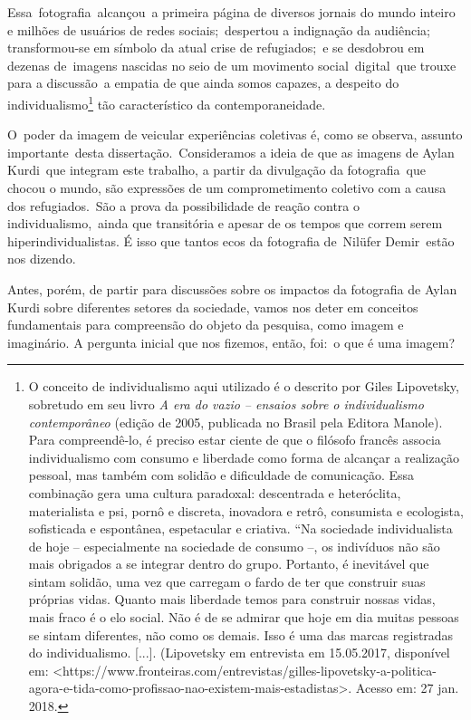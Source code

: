 \documentclass[
  letterpaper,
  a4paper,
  12pt]{scrbook}
\begin{document}
Essa~fotografia~alcançou~a primeira página de diversos jornais do mundo
inteiro e milhões de usuários de redes sociais;~despertou a indignação
da audiência; transformou-se em símbolo da atual crise de refugiados;~e
se desdobrou em dezenas de~imagens nascidas no seio de um movimento
social~digital~que trouxe para a discussão~a empatia de que ainda somos
capazes, a despeito do individualismo\footnote{O conceito de
  individualismo aqui utilizado é o descrito por Giles Lipovetsky,
  sobretudo em seu livro \emph{A era do vazio -- ensaios sobre o
  individualismo contemporâneo} (edição de 2005, publicada no Brasil
  pela Editora Manole). Para compreendê-lo, é preciso estar ciente de
  que o filósofo francês associa individualismo com consumo e liberdade
  como forma de alcançar a realização pessoal, mas também com solidão e
  dificuldade de comunicação. Essa combinação gera uma cultura
  paradoxal: descentrada e heteróclita, materialista e psi, pornô e
  discreta, inovadora e retrô, consumista e ecologista, sofisticada e
  espontânea, espetacular e criativa. ``Na sociedade individualista de
  hoje -- especialmente na sociedade de consumo --, os indivíduos não
  são mais obrigados a se integrar dentro do grupo. Portanto, é
  inevitável que sintam solidão, uma vez que carregam o fardo de ter que
  construir suas próprias vidas. Quanto mais liberdade temos para
  construir nossas vidas, mais fraco é o elo social. Não é de se admirar
  que hoje em dia muitas pessoas se sintam diferentes, não como os
  demais. Isso é uma das marcas registradas do individualismo.
  {[}...{]}. (Lipovetsky em entrevista em 15.05.2017, disponível em:
  \textless https://www.fronteiras.com/entrevistas/gilles-lipovetsky-a-politica-agora-e-tida-como-profissao-nao-existem-mais-estadistas\textgreater.
  Acesso em: 27 jan. 2018.} tão característico da contemporaneidade.

O~poder da imagem de veicular experiências coletivas é, como se observa,
assunto importante~desta dissertação.~Consideramos a ideia de que as
imagens de Aylan Kurdi~que integram este trabalho, a partir da
divulgação da fotografia~que chocou o mundo, são expressões de um
comprometimento coletivo com a causa dos refugiados.~São a prova da
possibilidade de reação contra o individualismo,~ainda que transitória e
apesar de os tempos que correm serem hiperindividualistas. É isso que
tantos ecos da fotografia de~Nilüfer Demir~estão nos dizendo.~

Antes, porém, de partir para discussões sobre os impactos da fotografia
de Aylan Kurdi sobre diferentes setores da sociedade, vamos nos deter em
conceitos fundamentais para compreensão do objeto da pesquisa, como
imagem e imaginário. A pergunta inicial que nos fizemos, então, foi:~o
que é uma imagem?
\end{document}
